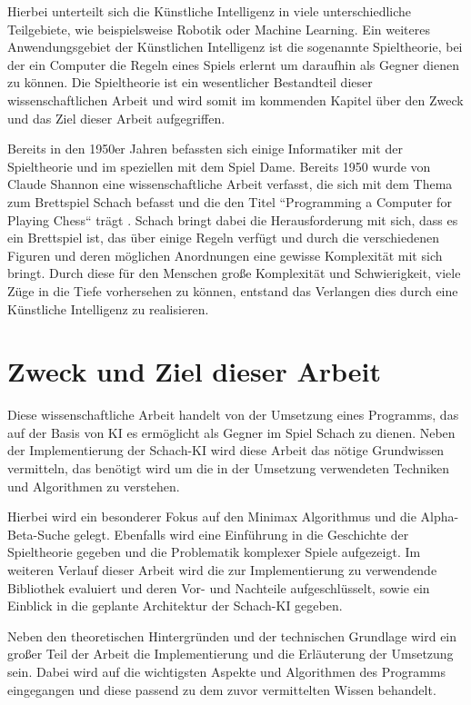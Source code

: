 Hierbei unterteilt sich die Künstliche Intelligenz in viele unterschiedliche Teilgebiete, wie beispielsweise Robotik oder Machine Learning. Ein weiteres Anwendungsgebiet der Künstlichen Intelligenz ist die sogenannte Spieltheorie, bei der ein Computer die Regeln eines Spiels erlernt um daraufhin als Gegner dienen zu können. Die Spieltheorie ist ein wesentlicher Bestandteil dieser wissenschaftlichen Arbeit und wird somit im kommenden Kapitel über den Zweck und das Ziel dieser Arbeit aufgegriffen.

Bereits in den 1950er Jahren befassten sich einige Informatiker mit der Spieltheorie und im speziellen mit dem Spiel Dame. Bereits 1950 wurde von Claude Shannon eine wissenschaftliche Arbeit verfasst, die sich mit dem Thema zum Brettspiel Schach befasst und die den Titel ``Programming a Computer for Playing Chess`` trägt \cite{Shannon1950}. Schach bringt dabei die Herausforderung mit sich, dass es ein Brettspiel ist, das über einige Regeln verfügt und durch die verschiedenen Figuren und deren möglichen Anordnungen eine gewisse Komplexität mit sich bringt. Durch diese für den Menschen große Komplexität und Schwierigkeit, viele Züge in die Tiefe vorhersehen zu können, entstand das Verlangen dies durch eine Künstliche Intelligenz zu realisieren.


\section{Zweck und Ziel dieser Arbeit}\label{zweck_und_ziel}
Diese wissenschaftliche Arbeit handelt von der Umsetzung eines Programms, das auf der Basis von KI es ermöglicht als Gegner im Spiel Schach zu dienen. Neben der Implementierung der Schach-KI wird diese Arbeit das nötige Grundwissen vermitteln, das benötigt wird um die in der Umsetzung verwendeten Techniken und Algorithmen zu verstehen. 

Hierbei wird ein besonderer Fokus auf den Minimax Algorithmus und die Alpha-Beta-Suche gelegt. Ebenfalls wird eine Einführung in die Geschichte der Spieltheorie gegeben und die Problematik komplexer Spiele aufgezeigt. Im weiteren Verlauf dieser Arbeit wird die zur Implementierung zu verwendende Bibliothek evaluiert und deren Vor- und Nachteile aufgeschlüsselt, sowie ein Einblick in die geplante Architektur der Schach-KI gegeben.

Neben den theoretischen Hintergründen und der technischen Grundlage wird ein großer Teil der Arbeit die Implementierung und die Erläuterung der Umsetzung sein. Dabei wird auf die wichtigsten Aspekte und Algorithmen des Programms eingegangen und diese passend zu dem zuvor vermittelten Wissen behandelt. 

